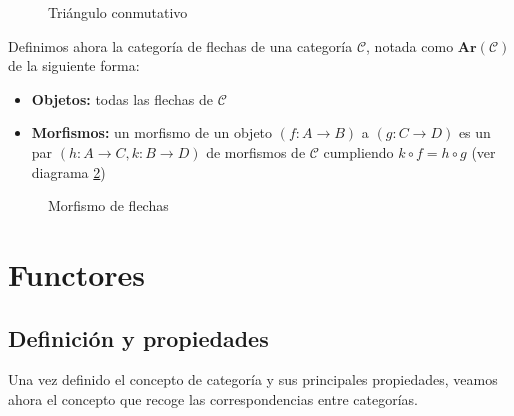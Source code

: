 \begin{figure}[htpb]
    \centering
    \caption{Triángulo conmutativo}
    \label{diag:traingulo_desde}
\end{figure}

\begin{ejemplo}
    Definimos ahora la categoría de flechas de una categoría $\mathscr{C}$, notada como $\textbf{Ar}(\mathscr{C})$ de la siguiente forma:
    \begin{itemize}
        \item \textbf{Objetos: } todas las flechas de $\mathscr{C}$
        \item \textbf{Morfismos: } un morfismo de un objeto $(f: A \longrightarrow B)$ a $(g: C \longrightarrow D)$ es un par $(h: A \longrightarrow C, k: B \longrightarrow D)$ de morfismos de $\mathscr{C}$ cumpliendo $k \circ f = h \circ g$ (ver diagrama \ref{diag:diagrama-flechas})
    \end{itemize}
\end{ejemplo}

\begin{figure}[htpb] %
    \centering
    \caption{Morfismo de flechas}
    \label{diag:diagrama-flechas}
\end{figure}


\section{Functores}
\subsection{Definición y propiedades}
Una vez definido el concepto de categoría y sus principales propiedades, veamos ahora el concepto que recoge las correspondencias entre categorías.

